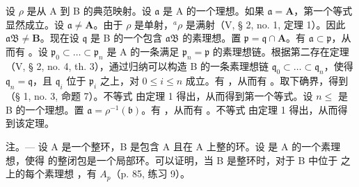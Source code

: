 设 \(\rho\) 是从 A 到 B 的典范映射。设 \(\mathfrak{a}\) 是 A 的一个理想。如果 \(\mathfrak{a} = \mathbf{A}\)，第一个等式显然成立。设 \(\mathfrak{a} \neq \mathbf{A}\)。由于 \(\rho\) 是单射，\({}^{a}\rho\) 是满射（V, § 2, no. 1, 定理 1）。因此 \(\mathfrak{aB} \neq \mathbf{B}\)。现在设 \(\mathfrak{q}\) 是 B 的一个包含 \(\mathfrak{aB}\) 的素理想。置 \(\mathfrak{p} = \mathfrak{q} \cap \mathbf{A}\)。有 \(\mathfrak{a} \subset \mathfrak{p}\)，从而有 。设 \(\mathfrak{p}_0 \subset \ldots \subset \mathfrak{p}_n\) 是 A 的一条满足 \(\mathfrak{p}_n = \mathfrak{p}\) 的素理想链。根据第二存在定理（V, § 2, no. 4, th. 3），通过归纳可以构造 B 的一条素理想链 \(\mathfrak{q}_0 \subset \ldots \subset \mathfrak{q}_n\)，使得 \(\mathfrak{q}_n = \mathfrak{q}\)，且 \(\mathfrak{q}_i\) 位于 \(\mathfrak{p}_i\) 之上，对 \(0 \leqslant i \leqslant n\) 成立。有  ，从而有  。取下确界，得到  （§ 1, no. 3, 命题 7）。不等式  由定理 1 得出，从而得到第一个等式。设 \(n \leqslant\) 是 B 的一个理想。置 \(\mathfrak{a} = \rho^{-1}(\mathfrak{b})\)。有  ，从而有  。不等式  由定理 1 得出，从而得到该定理。

注。--- 设 A 是一个整环，B 是包含 A 且在 A 上整的环。设  是 A 的一个素理想，使得  的整闭包是一个局部环。可以证明，当 B 是整环时，对于 B 中位于  之上的每个素理想  ，有 \(A_{p}\)（p. 85, 练习 9）。

